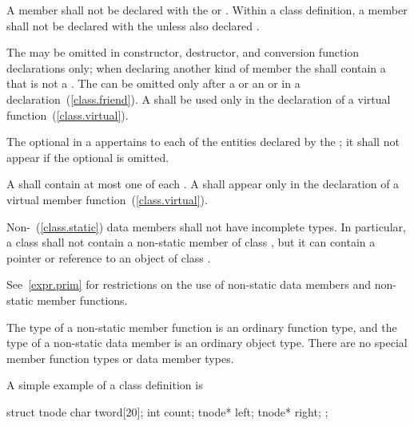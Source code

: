 \pnum
A member shall not be declared with the 
or 
. Within a class definition, a member shall not be declared with the   unless also declared .

\pnum
The  may be omitted in constructor, destructor,
and conversion function declarations only;
when declaring another kind of member the 
shall contain a  that is not a .
The
 can be omitted only after a
 or an  or in a
 declaration~(\ref{class.friend}). A
 shall be used only in the declaration of a
virtual function~(\ref{class.virtual}).

\pnum
The optional  in a 
appertains to each of the entities declared by the ;
it shall not appear if the optional  is omitted.

\pnum
A  shall contain at most one of each
.
A 
shall appear only in the declaration of a virtual member
function~(\ref{class.virtual}).

\pnum
{}%
Non-~(\ref{class.static}) data members shall not have
incomplete types. In particular, a class  shall not contain a
non-static member of class , but it can contain a pointer or
reference to an object of class .

\pnum
\enternote
See~\ref{expr.prim} for restrictions on the use of non-static data
members and non-static member functions.
\exitnote

\pnum
\enternote
The type of a non-static member function is an ordinary function type,
and the type of a non-static data member is an ordinary object type.
There are no special member function types or data member types.
\exitnote

\pnum
{}%
\enterexample
A simple example of a class definition is

\begin{codeblock}
struct tnode {
  char tword[20];
  int count;
  tnode* left;
  tnode* right;
};
\end{codeblock}

